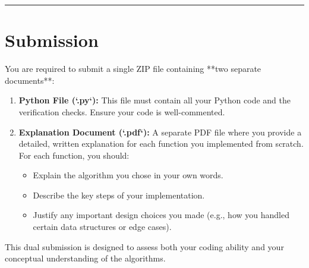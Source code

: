 \documentclass[12pt]{article}
\begin{document}
\vspace{2em}
\hrule
\section*{Submission}

You are required to submit a single ZIP file containing **two separate documents**:

\begin{enumerate}
    \item \textbf{Python File (`.py`):} This file must contain all your Python code and the verification checks. Ensure your code is well-commented.
    
    \item \textbf{Explanation Document (`.pdf`):} A separate PDF file where you provide a detailed, written explanation for each function you implemented from scratch. For each function, you should:
    \begin{itemize}
        \item Explain the algorithm you chose in your own words.
        \item Describe the key steps of your implementation.
        \item Justify any important design choices you made (e.g., how you handled certain data structures or edge cases).
    \end{itemize}
\end{enumerate}

This dual submission is designed to assess both your coding ability and your conceptual understanding of the algorithms.
\end{document}
